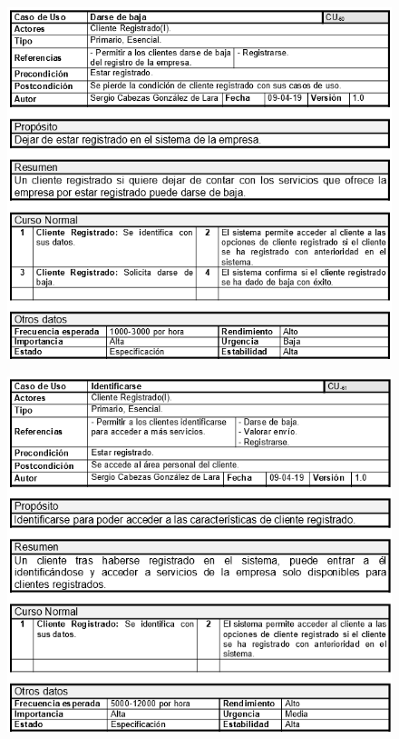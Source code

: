 \begin{figure}[H]
	\centering
	\includegraphics[width=16cm]{60}
\end{figure}
\begin{figure}[H]
	\centering
	\includegraphics[width=16cm]{61}
\end{figure}
